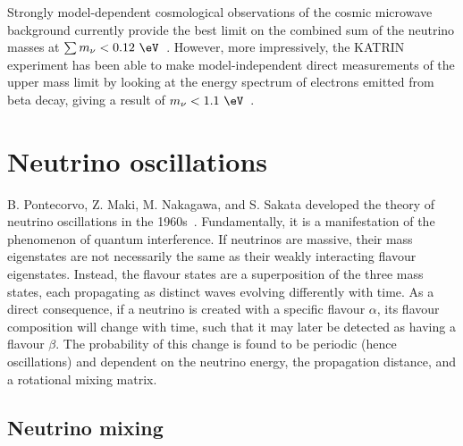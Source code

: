 Strongly model-dependent cosmological observations of the cosmic microwave background currently
provide the best limit on the combined sum of the neutrino masses at $\sum m_{\nu} <
0.12~\eV$~\cite{planck2018}. However, more impressively, the KATRIN experiment has been able to
make model-independent direct measurements of the upper mass limit by looking at the energy
spectrum of electrons emitted from beta decay, giving a result of $m_{\nu} <
1.1~\eV$~\cite{aker2019}.

\section{Neutrino oscillations} %
\label{sec:theory_oscillations} %

B. Pontecorvo, Z. Maki, M. Nakagawa, and S. Sakata developed the theory of neutrino oscillations
in the 1960s~\cite{maki1962, pontecorvo1967, pontecorvo1969}. Fundamentally, it is a manifestation
of the phenomenon of quantum interference. If neutrinos are massive, their mass eigenstates are
not necessarily the same as their weakly interacting flavour eigenstates. Instead, the flavour
states are a superposition of the three mass states, each propagating as distinct waves evolving
differently with time. As a direct consequence, if a neutrino is created with a specific flavour
$\alpha$, its flavour composition will change with time, such that it may later be detected as
having a flavour $\beta$. The probability of this change is found to be periodic (hence
oscillations) and dependent on the neutrino energy, the propagation distance, and a rotational
mixing matrix.

\subsection{Neutrino mixing} %
\label{sec:theory_oscillations_mixing} %

